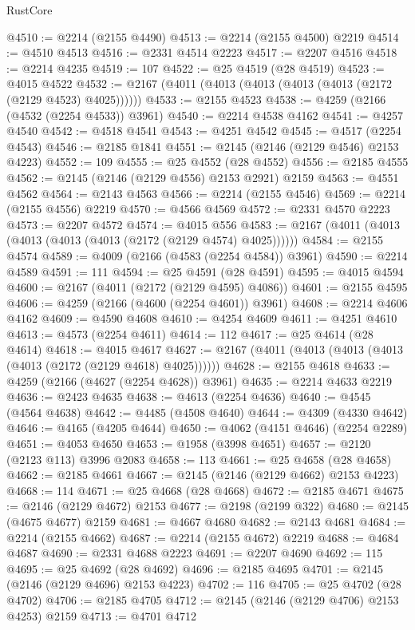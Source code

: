\begin{lexlean}{RustCore}
\begin{coremodule}
@4510 := @2214 (@2155 @4490)
@4513 := @2214 (@2155 @4500) @2219
@4514 := @4510 @4513
@4516 := @2331 @4514 @2223
@4517 := @2207 @4516
@4518 := @2214 @4235
@4519 := 107
@4522 := @25 @4519 (@28 @4519)
@4523 := @4015 @4522
@4532 := @2167 (@4011 (@4013 (@4013 (@4013 (@4013 (@2172 (@2129 @4523) @4025))))))
@4533 := @2155 @4523
@4538 := @4259 (@2166 (@4532 (@2254 @4533)) @3961)
@4540 := @2214 @4538 @4162
@4541 := @4257 @4540
@4542 := @4518 @4541
@4543 := @4251 @4542
@4545 := @4517 (@2254 @4543)
@4546 := @2185 @1841
@4551 := @2145 (@2146 (@2129 @4546) @2153 @4223)
@4552 := 109
@4555 := @25 @4552 (@28 @4552)
@4556 := @2185 @4555
@4562 := @2145 (@2146 (@2129 @4556) @2153 @2921) @2159
@4563 := @4551 @4562
@4564 := @2143 @4563
@4566 := @2214 (@2155 @4546)
@4569 := @2214 (@2155 @4556) @2219
@4570 := @4566 @4569
@4572 := @2331 @4570 @2223
@4573 := @2207 @4572
@4574 := @4015 @556
@4583 := @2167 (@4011 (@4013 (@4013 (@4013 (@4013 (@2172 (@2129 @4574) @4025))))))
@4584 := @2155 @4574
@4589 := @4009 (@2166 (@4583 (@2254 @4584)) @3961)
@4590 := @2214 @4589
@4591 := 111
@4594 := @25 @4591 (@28 @4591)
@4595 := @4015 @4594
@4600 := @2167 (@4011 (@2172 (@2129 @4595) @4086))
@4601 := @2155 @4595
@4606 := @4259 (@2166 (@4600 (@2254 @4601)) @3961)
@4608 := @2214 @4606 @4162
@4609 := @4590 @4608
@4610 := @4254 @4609
@4611 := @4251 @4610
@4613 := @4573 (@2254 @4611)
@4614 := 112
@4617 := @25 @4614 (@28 @4614)
@4618 := @4015 @4617
@4627 := @2167 (@4011 (@4013 (@4013 (@4013 (@4013 (@2172 (@2129 @4618) @4025))))))
@4628 := @2155 @4618
@4633 := @4259 (@2166 (@4627 (@2254 @4628)) @3961)
@4635 := @2214 @4633 @2219
@4636 := @2423 @4635
@4638 := @4613 (@2254 @4636)
@4640 := @4545 (@4564 @4638)
@4642 := @4485 (@4508 @4640)
@4644 := @4309 (@4330 @4642)
@4646 := @4165 (@4205 @4644)
@4650 := @4062 (@4151 @4646) (@2254 @2289)
@4651 := @4053 @4650
@4653 := @1958 (@3998 @4651)
@4657 := @2120 (@2123 @113) @3996 @2083
@4658 := 113
@4661 := @25 @4658 (@28 @4658)
@4662 := @2185 @4661
@4667 := @2145 (@2146 (@2129 @4662) @2153 @4223)
@4668 := 114
@4671 := @25 @4668 (@28 @4668)
@4672 := @2185 @4671
@4675 := @2146 (@2129 @4672) @2153
@4677 := @2198 (@2199 @322)
@4680 := @2145 (@4675 @4677) @2159
@4681 := @4667 @4680
@4682 := @2143 @4681
@4684 := @2214 (@2155 @4662)
@4687 := @2214 (@2155 @4672) @2219
@4688 := @4684 @4687
@4690 := @2331 @4688 @2223
@4691 := @2207 @4690
@4692 := 115
@4695 := @25 @4692 (@28 @4692)
@4696 := @2185 @4695
@4701 := @2145 (@2146 (@2129 @4696) @2153 @4223)
@4702 := 116
@4705 := @25 @4702 (@28 @4702)
@4706 := @2185 @4705
@4712 := @2145 (@2146 (@2129 @4706) @2153 @4253) @2159
@4713 := @4701 @4712

\end{coremodule}
\end{lexlean}
